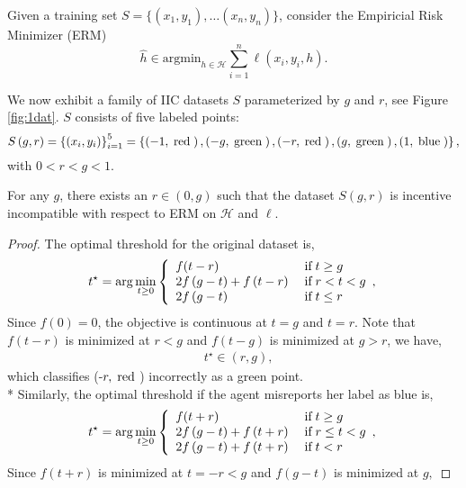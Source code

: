 \documentclass{article}
\def\H{\mathcal H}
\def\argmin{\mathrm{argmin}}
\begin{document}
 Given a training set $S=\{(x_1,y_1), \ldots (x_n, y_n)\}$, consider the Empiricial Risk Minimizer (ERM)
 \begin{equation}
 \hat h \in \argmin_{h \in \H} \sum_{i=1}^n \ell(x_i, y_i, h).
 \end{equation}

We now exhibit a family of IIC datasets $S $ parameterized by $g $ and $r $, see Figure \ref{fig:1dat}. $S $ consists of five labeled points:
\begin{equation} 
S\left(g, r\right)  = \left\{\left(x_{i}, y_{i}\right)\right\}_{i=1}^{5} = \left\{\left(-1, \text{\;red\;}\right), \left(-g, \text{\;green\;}\right), \left(-r, \text{\;red\;}\right), \left(g, \text{\;green\;}\right), \left(1, \text{\;blue\;}\right)\right\},
\end{equation}
with $0 < r < g < 1$.
\newline \newline
\begin{prop} \label{prop:ex1} 
For any $g $, there exists an $r  \in \left(0, g\right)$ such that the dataset $S\left(g, r \right) $ is incentive incompatible with respect to ERM on $\mathcal{H}$ and $\ell$.
\end{prop}
\begin{proof} \label{proof:ex1pf} 
The optimal threshold for the original dataset is,
\begin{equation} t^\star  = \arg\displaystyle\min_{t \geq  0}\left\{ \begin{array}{ll}
f(t - r)& \text{\;if\;} t \geq  g \\
2 f\left(g - t\right) + f\left(t - r\right)& \text{\;if\;} r < t < g \\
2 f\left(g - t\right)& \text{\;if\;} t \leq  r \\
\end{array},\right. \end{equation}
Since $f\left(0\right)  = 0$, the objective is continuous at $t  = g $ and $t  = r $. Note that $f\left(t - r\right) $ is minimized at $r  < g$ and $f\left(t - g\right) $ is minimized at $g  > r$, we have,
\begin{align*}
&t^\star  \in \left(r , g \right),
\end{align*}
which classifies (-$r , \text{\;red\;}$) incorrectly as a green point.
\\* Similarly, the optimal threshold if the agent misreports her label as blue is,
\begin{equation} t^\star  = \arg\displaystyle\min_{t \geq  0}\left\{ \begin{array}{ll}
f(t + r)& \text{\;if\;} t \geq  g \\
2 f\left(g - t\right) + f\left(t + r\right)& \text{\;if\;} r \leq  t < g \\
2 f\left(g - t\right) + f\left(t + r\right)& \text{\;if\;} t < r \\
\end{array},\right. \end{equation}
Since $f\left(t + r\right) $ is minimized at $t  = -r < g $ and $f\left(g - t\right) $ is minimized at $g, $
\end{proof}
\end{document}
